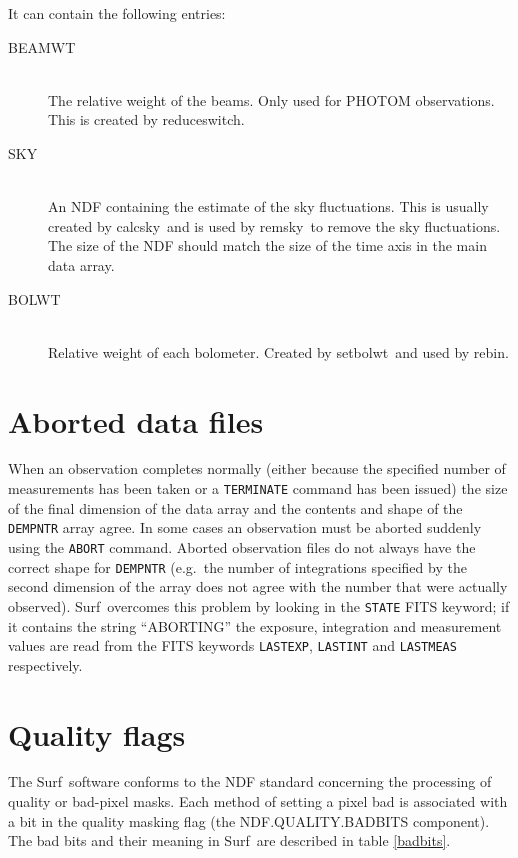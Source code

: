 \documentclass[twoside,11pt]{article}
\newcommand{\task}[1]{{\sf #1}}
\newcommand{\rebin}{\xref{\task{rebin}}{sun216}{REBIN}}
\newcommand{\calcsky}{\xref{\task{calcsky}}{sun216}{CALCSKY}}
\newcommand{\resw}{\xref{\task{reduce\_switch}}{sun216}{REDUCE_SWITCH}}
\newcommand{\remsky}{\xref{\task{remsky}}{sun216}{REMSKY}}
\newcommand{\setbolwt}{\xref{\task{setbolwt}}{sun216}{SETBOLWT}}
\newcommand{\scusoft}          {{\sc Surf}}
\newcommand{\xref}[3]{#1}
\newcommand{\xlabel}[1]{}
\renewcommand{\_}{\texttt{\symbol{95}}}
\begin{document}
It can contain the following entries:

\begin{description}
\item[BEAM\_WT]\mbox{} \\
The relative weight of the beams. Only used for PHOTOM observations. This is 
created by \resw.
\item[SKY]\mbox{} \\
An NDF containing the estimate of the sky fluctuations. This is usually
created by \calcsky\ and is used by \remsky\ to remove the sky fluctuations.
The size of the NDF should match the size of the time axis in the main data
array.
\item[BOLWT]\mbox{} \\
Relative weight of each bolometer. Created by \setbolwt\ and used by \rebin.
\end{description}


\section{Aborted data files}

When an observation completes normally (either because the specified number of
measurements has been taken or a \texttt{TERMINATE} command has been issued)
the size of the final dimension of the data array and the contents and shape
of the \texttt{DEM\_PNTR} array agree.  In some cases an observation must be
aborted suddenly using the \texttt{ABORT} command. 
Aborted observation files do not always have the correct shape for 
\texttt{DEM\_PNTR} (e.g.\ the number of integrations specified by the second
dimension of the array does not agree with the number that were actually
observed). \scusoft\ overcomes this problem by looking in the \texttt{STATE}
FITS keyword; if it contains the string ``ABORTING'' the exposure, integration 
and measurement values are read from the FITS keywords \texttt{LAST\_EXP}, 
\texttt{LAST\_INT} and \texttt{LAST\_MEAS} respectively.



\section{\xlabel{quality}Quality flags\label{sec:quality}}

The \scusoft\ software conforms to the NDF standard concerning the processing
of quality or bad-pixel masks. Each method of setting a pixel bad is
associated with a bit in the quality masking flag (the NDF.QUALITY.BADBITS
component). The bad bits and their meaning in \scusoft\ are described in table
\ref{badbits}.
\end{document}
